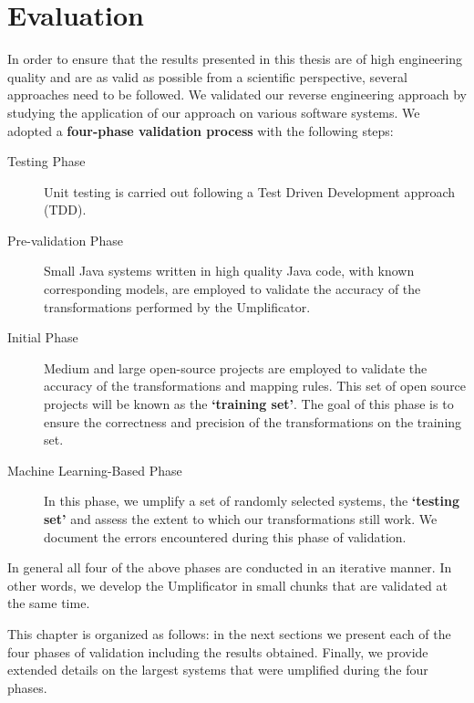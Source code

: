 \lhead{\emph{\leftmark}}  
\chapter{Evaluation}
\label{chap:evaluation}
In order to ensure that the results presented in this thesis are of high engineering quality and are as valid as possible from a scientific perspective, several approaches need to be followed. We validated our reverse engineering approach  by studying the application of our approach on various software systems. We adopted a \textbf{four-phase validation process} with the following steps:

\begin{description}

\item[Testing Phase]
Unit testing is carried out following a Test Driven Development approach (TDD).

\item[Pre-validation Phase]
Small Java systems written in high quality Java code, with known corresponding models, are employed to validate the accuracy of the transformations performed by the Umplificator.

\item[Initial Phase]
Medium and large  open-source projects are employed to validate the accuracy of the transformations and mapping rules. This set of open source projects will be known as the \textbf{`training set'}. The goal of this phase is to ensure the correctness and precision of the transformations on the training set.

\item[Machine Learning-Based Phase]
In this phase, we umplify a set of randomly selected systems, the \textbf{`testing set'} and assess the extent to which our transformations still work. We document the errors encountered during this phase of validation.

\end{description}

In general all four of the above phases are conducted in an iterative manner. In other words, we develop the Umplificator in small chunks that are validated at the same time.

This chapter is organized as follows: in the next sections we present each of the four phases of validation including the results obtained.  Finally, we provide extended details on the largest systems that were umplified during the four phases. 

